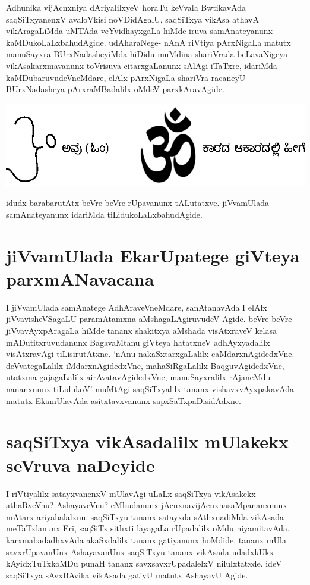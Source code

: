 Adhunika vijAcnxniya dAriyalilxyeV horaTu keVvala BwtikavAda saqSiTxyanenxV avaloVkisi noVDidAgalU, saqSiTxya vikAsa athavA vikAragaLiMda uMTAda veYvidhayxgaLa hiMde iruva samAnateyanunx kaMDukoLaLxbahudAgide. udAharaNege- nAnA riVtiya pArxNigaLa matutx manuSayxra BUrxNadasheyiMda hiDidu muMdina shariVrada beLavaNigeya vikAsakarxmavanunx toVrisuva citarxgaLanunx sAlAgi iTaTxre, idariMda kaMDubaruvudeVneMdare, elAlx pArxNigaLa shariVra racaneyU BUrxNadasheya pArxraMBadalilx oMdeV parxkAravAgide.

\begin{center}
\includegraphics{chap5-fig2.eps}
\end{center}

idudx barabarutAtx beVre beVre rUpavanunx tALutatxve. jiVvamUlada samAnateyanunx idariMda tiLidukoLaLxbahudAgide.

\section*{jiVvamUlada EkarUpatege giVteya parxmANavacana}

I jiVvamUlada samAnatege AdhAraveVneMdare, sanAtanavAda I elAlx jiVvavisheVSagaLU paramAtamxna aMshagaLAgiruvudeV Agide. beVre beVre jiVvavAyxpAragaLa hiMde tananx shakitxya aMshada visAtxraveV kelasa mADutitxruvudanunx BagavaMtanu giVteya hatatxneV adhAyxyadalilx visAtxravAgi tiLisirutAtxne. `nAnu nakaSxtarxgaLalilx caMdarxnAgidedxVne. deVvategaLalilx iMdarxnAgidedxVne, mahaSiRgaLalilx BaqguvAgidedxVne, utatxma gajagaLalilx airAvatavAgidedxVne, manuSayxralilx rAjaneMdu nananxnunx tiLidukoV' muMtAgi saqSiTxyalilx tananx vishavxvAyxpakavAda matutx EkamUlavAda asitxtavxvanunx  sapxSaTxpaDisidAdxne.

\section*{saqSiTxya vikAsadalilx mUlakekx seVruva naDeyide}

I riVtiyalilx satayxvanenxV mUlavAgi uLaLx saqSiTxya vikAsakekx athaRveVnu? AshayaveVnu? eMbudanunx jAcnxnavijAcnxnasaMpananxnunx mAtarx ariyabalalxnu. saqSiTxyu tananx satayxda sAthxnadiMda vikAsada meTaTxlanunx Eri, saqSiTx sithxti layagaLa rUpadalilx oMdu niyamitavAda, karxmabadadhxvAda akaSxdalilx tananx gatiyanunx hoMdide. tananx mUla savxrUpavanUnx AshayavanUnx saqSiTxyu tananx vikAsada udadxkUkx kAyidxTuTxkoMDu punaH tananx savxsavxrUpadalelxV nilulxtatxde. ideV saqSiTxya sAvxBAvika vikAsada gatiyU matutx AshayavU Agide.

